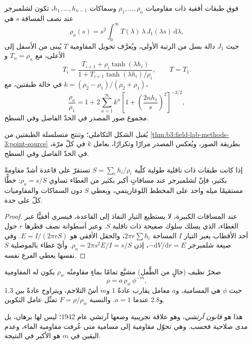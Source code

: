 \begin{proposition}\label{prop:b3:field-lab-methods-3:layers}
فوق طبقات أفقية ذات مقاوميات $\rho_1, \dots, \rho_n$
وسماكات $h_1, \dots, h_{n-1}$، تكون  لشلمبرجر
عند نصف المسافة $s$ هي
\[
\rho_a(s) = s^2\int_0^\infty T(\lambda)\,\lambda\,J_1(\lambda s)\,\mathrm{d}\lambda ,
\]
حيث $J_1$ دالة بسل من الرتبة الأولى، ويُعرَّف تحويل المقاومية
$T$ يُبنى من الأسفل إلى الأعلى، مع $T_n = \rho_n$
و\[
T_i = \frac{T_{i+1} + \rho_i\tanh(\lambda h_i)}{1 + T_{i+1}\tanh(\lambda h_i)/\rho_i} ,
\qquad T = T_1 .
\]
في حالة طبقتين، مع $k = (\rho_2 - \rho_1)/(\rho_2 + \rho_1)$،
\[
\frac{\rho_a}{\rho_1} = 1 + 2\sum_{n=1}^{\infty} k^n
  \left[1 + \left(\frac{2nh_1}{s}\right)^2\right]^{-3/2} ,
\]
مجموع صور المصدر في الحدّ الفاصل وفي السطح.
\end{proposition}
يُقبل الشكل التكاملي؛ وتنتج متسلسلة الطبقتين
من \cref{thm:b3:field-lab-methods-3:point-source} بطريقة الصور،
ويُعكس المصدر مرارًا وتكرارًا، بعامل $k$ في كلّ
مرّة، في الحدّ الفاصل وفي السطح.

\begin{proposition}\label{prop:b3:field-lab-methods-3:conductance}
إذا كانت طبقات ذات ناقلية طولية كلّية $S = \sum_i h_i/\rho_i$ تستقرّ
على قاعدة أشدّ مقاومةً بكثير، فإنّ  لشلمبرجر عند
مسافاتٍ أكبر بكثير من الغطاء تساوي $\rho_a = s/S$: خطًّا مستقيمًا
ميله واحد على المخطط اللوغاريتمي، ويعطي $S$ دون
السماكات والمقاوميات كلّ على حدة.
\end{proposition}

\begin{proof}
عند المسافات الكبيرة، لا يستطيع التيار النفاذ إلى القاعدة، فيسري
أفقيًّا عبر الغطاء، الذي يسلك سلوك صفيحة ذات
ناقلية $S$. وعبر أسطوانة نصف قطرها $r$ حول أحد الأقطاب
يعبر التيار $I$ المساحة $2\pi r\sum h_i$، والحقل الأفقي
هو $E = I/(2\pi rS)$. وفي صيغة شلمبرجر $-\mathrm{d}V/
\mathrm{d}r = E$، إذن $\rho_a = 2\pi s^2 E/I = s/S$. وأيّ غطاء
بالموصلية $S$ نفسها يعطي الفرع نفسه.
\end{proof}

\begin{proposition}\label{prop:b3:field-lab-methods-3:archie}
صخرٌ نظيف (خالٍ من الطَّفل) مشبَّع تمامًا بماءٍ مقاومتُه
$\rho_w$ يكون له المقاومية
\[
\rho = a\,\rho_w\,\phi^{-m} ,
\]
حيث $\phi$ هي المسامية، و$a$ معامل يقارب عادةً $1$
و$m$ أسّ التلاحم، ويتراوح عادةً بين \num{1.3}
و\num{2.8} عندما $a = 1$. والنسبة $F = \rho/\rho_w$ تمثّل عامل
التكوين.
\end{proposition}
هذا هو \emph{قانون آرتشي}، وهو علاقة تجريبية
وضعها آرتشي عام 1942؛ ليس لها برهان، بل مدى صلاحية فحسب. وهي تحوّل مقاومية إلى مسامية متى عُرفت
مقاومية الماء، وعدم اليقين في $m$ هو الأكبر في النتيجة.

